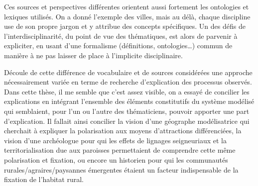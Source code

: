 Ces sources et perspectives différentes orientent aussi fortement les ontologies et lexiques utilisés.
On a donné l'exemple des villes, mais au délà, chaque discipline use de son propre jargon et y attribue des concepts spécifiques.
Un des défis de l'interdisciplinarité, du point de vue des thématiques, est alors de parvenir à expliciter, en usant d'une formalisme (définitions, ontologies\ldots) commun de manière à ne pas laisser de place à l'implicite disciplinaire.

Découle de cette différence de vocabulaire et de sources considérées une approche nécessairement variée en terme de recherche d'explication des processus observés.
Dans cette thèse, il me semble que c'est assez visible, on a essayé de concilier les explications en intégrant l'ensemble des éléments constitutifs du système modélisé qui semblaient, pour l'un ou l'autre des thématiciens, pouvoir apporter une part d'explication.
Il fallait ainsi concilier la vision d'une géographe modélisatrice qui cherchait à expliquer la polarisation aux moyens d'attractions différenciées, la vision d'une archéologue pour qui les effets de lignages seigneuriaux et la territorialisation due aux paroisses permettaient de comprendre cette même polarisation et fixation, ou encore un historien pour qui les communautés rurales/agraires/paysannes émergentes étaient un facteur indispensable de la fixation de l'habitat rural.

